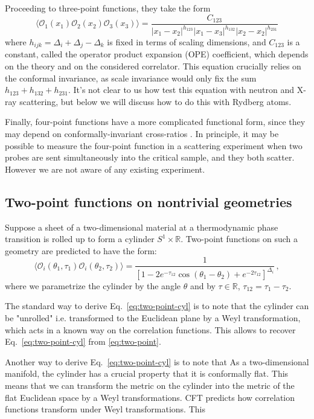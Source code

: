 \documentclass[a4paper,11pt]{article}
\newcommand{\beq}{\begin{equation}}
\newcommand{\eeq}{\end{equation}}
\theoremstyle{remark}
\theoremstyle{theorem}
\begin{document}
Proceeding to three-point functions, they take the form \cite{}
\beq
\langle \mathcal{O}_1(x_1) \mathcal{O}_2(x_2) \mathcal{O}_3(x_3)\rangle = 
\frac{C_{123}}{|x_1-x_2|^{h_{123}} |x_1-x_3|^{h_{132}} |x_2-x_2|^{h_{231}}}
\eeq
where $h_{ijk}=\Delta_i+\Delta_j-\Delta_k$ is fixed in terms of scaling dimensions, and $C_{123}$ is a constant, called the operator product expansion (OPE) coefficient, which depends on the theory and on the considered correlator. This equation crucially relies on the conformal invariance, as scale invariance would only fix the sum $h_{123}+h_{132}+h_{231}$. It's not clear to us how test this equation with neutron and X-ray scattering, but below we will discuss how to do this with Rydberg atoms.

Finally, four-point functions have a more complicated functional form, since they may depend on conformally-invariant cross-ratios \cite{}. %
In principle, it may be possible to measure the four-point function in a scattering experiment when two probes are sent simultaneously into the critical sample, and they both scatter. However we are not aware of any existing experiment.

\subsection{Two-point functions on nontrivial geometries}

Suppose a sheet of a two-dimensional material at a thermodynamic phase transition is rolled up to form a cylinder $S^1\times \mathbb{R}$. Two-point functions on such a geometry are predicted to have the form:
\beq
\langle \mathcal{O}_i(\theta_1,\tau_1) \mathcal{O}_i(\theta_2,\tau_2)\rangle = \frac{1}{[1-2 e^{-\tau_{12}}\cos (\theta_{1}-\theta_2)+e^{-2\tau_{12}}]^{\Delta_i}}\,,
\label{eq:two-point-cyl}
\eeq
where we parametrize the cylinder by the angle $\theta$ and by $\tau\in\mathbb{R}$, $\tau_{12}=\tau_1-\tau_2$.

The standard way to derive Eq.~\eqref{eq:two-point-cyl} is to note that the cylinder can be "unrolled" i.e. transformed to the Euclidean plane by a Weyl transformation, which acts in a known way on the correlation functions. This allows to recover Eq.~\eqref{eq:two-point-cyl} from \eqref{eq:two-point}.
 
Another way to derive Eq.~\eqref{eq:two-point-cyl} is to note that 
As a two-dimensional manifold, the cylinder has a crucial property that it is conformally flat. This means that we can transform the metric on the cylinder into the metric of the flat Euclidean space by a Weyl transformations. CFT predicts how correlation functions transform under Weyl transformations. This 




\end{document}
